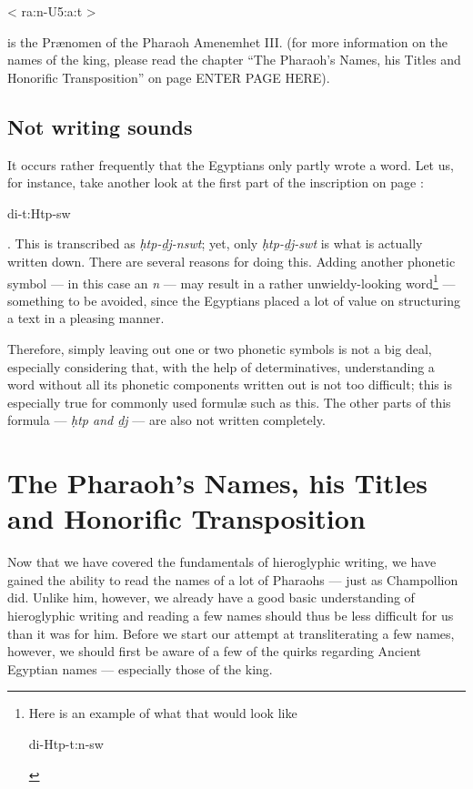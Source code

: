 \documentclass[a5paper,twoside,11pt]{report}
\begin{document}
      \begin{hieroglyph}< ra:n-U5:a:t >\end{hieroglyph} is the Prænomen of the Pharaoh Amenemhet III. (for more information on the names of the king, please read the chapter “The Pharaoh’s Names, his Titles and Honorific Transposition” on page ENTER PAGE HERE).

  \chapter*{Not writing sounds}
		It occurs rather frequently that the Egyptians only partly wrote a word. Let us, for instance, take another look at the first part of the inscription on page \pageref{fig:2}: \begin{hieroglyph}di-t:Htp-sw\end{hieroglyph}. This is transcribed as \textit{ḥtp-ḏj-nswt}; yet, only \textit{ḥtp-ḏj-swt} is what is actually written down. There are several reasons for doing this. Adding another phonetic symbol — in this case an \textit{n} — may result in a rather unwieldy-looking word\footnote{Here is an example of what that would look like \begin{hieroglyph}di-Htp-t:n-sw\end{hieroglyph}} — something to be avoided, since the Egyptians placed a lot of value on structuring a text in a pleasing manner.

		Therefore, simply leaving out one or two phonetic symbols is not a big deal, especially considering that, with the help of determinatives, understanding a word without all its phonetic components written out is not too difficult; this is especially true for commonly used formulæ such as this. The other parts of this formula — \textit{ḥtp and ḏj} — are also not written completely.

\part*{The Pharaoh’s Names, his Titles and Honorific Transposition}

	Now that we have covered the fundamentals of hieroglyphic writing, we have gained the ability to read the names of a lot of Pharaohs — just as Champollion did. Unlike him, however, we already have a good basic understanding of hieroglyphic writing and reading a few names should thus be less difficult for us than it was for him. Before we start our attempt at transliterating a few names, however, we should first be aware of a few of the quirks regarding Ancient Egyptian names — especially those of the king.
\end{document}
